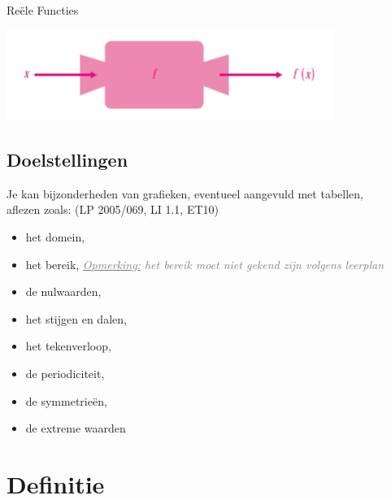 \documentclass[12pt,twoside]{article}
\newcommand{\teacher}[1]{\textcolor{gray}{\emph{\underline{Opmerking:} #1}}}
\newcommand{\teacher}[1]{}
\begin{document}
\pagestyle{fancy}
\lhead{}

\begin{theorie}

  \thispagestyle{empty}
  \begin{center}
    \begin{mdframed}
      \centering
      \fontsize{35}{70}\selectfont Reële Functies
    \end{mdframed}
    \vfill
    \includegraphics[width=0.8\textwidth]{FunctieMachine}
    \vfill
  \end{center}
  \vspace*{-2cm}
  \subsection*{Doelstellingen}
  {\singlespacing

    Je kan bijzonderheden van grafieken,
    eventueel aangevuld met tabellen,\\ aflezen zoals: \hfill  {\scriptsize(LP 2005/069, LI 1.1, ET10)}
    \begin{itemize}
    \item het domein,
    \item het bereik, \teacher{het bereik moet niet gekend zijn volgens leerplan}
    \item de nulwaarden,
    \item het stijgen en dalen,
    \item het tekenverloop,
    \item de periodiciteit,
    \item de symmetrieën,
    \item de extreme waarden
    \end{itemize}
  }

  \fancyhead[RE,LO]{}

  \onehalfspacing

  \pagebreak
\end{theorie}

\section{Definitie}
\end{document}
